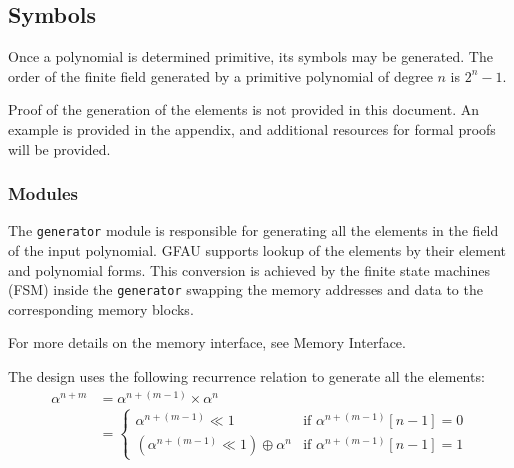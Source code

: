 \subsection{Symbols}

    Once a polynomial is determined primitive, its symbols may be generated.
    The order of the finite field generated by a primitive polynomial of degree
    $n$ is $2^n-1$.

    Proof of the generation of the elements is not provided in this document.
    An example is provided in the appendix, and additional resources for formal
    proofs will be provided.

        \subsubsection{Modules} The \texttt{generator} module is responsible
        for generating all the elements in the field of the input polynomial.
        GFAU supports lookup of the elements by their element and polynomial
        forms. This conversion is achieved by the finite state machines (FSM)
        inside the \texttt{generator} swapping the memory addresses and data to
        the corresponding memory blocks.

        For more details on the memory interface, see Memory Interface.

        The design uses the following recurrence relation to generate all the
        elements:
        \begin{equation*}
            \begin{split}
                \alpha^{n+m} & =\alpha^{n+(m-1)}\times \alpha^{n} \\
                & = \begin{cases}
                        \alpha^{n+(m-1)} \ll 1 &
                        \text{if $\alpha^{n+(m-1)}[n-1] = 0$} \\
                        (\alpha^{n+(m-1)} \ll 1 ) \oplus \alpha^{n} &
                        \text{if $\alpha^{n+(m-1)}[n-1] = 1$}
                    \end{cases}
            \end{split}
        \end{equation*}

